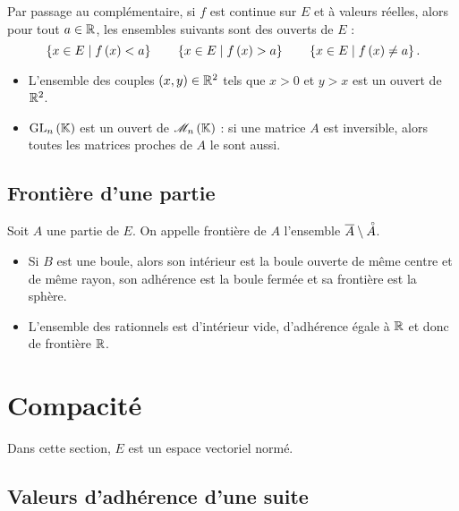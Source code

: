 Par passage au complémentaire, si \(f\) est continue sur \(E\) et à valeurs réelles, alors pour tout \(a\in\mathbb{R}\), les ensembles suivants sont des ouverts de \(E\) : \[\left\lbrace x\in E\;\middle|\; f\left(x\right)<a\right\rbrace\qquad\left\lbrace x\in E\;\middle|\; f\left(x\right)>a\right\rbrace\qquad\left\lbrace x\in E\;\middle|\; f\left(x\right)\not=a\right\rbrace.\]

\begin{ex}
\begin{itemize}
    \item L'ensemble des couples \(\left(x,y\right)\in\mathbb{R}^2\) tels que \(x>0\) et \(y>x\) est un ouvert de \(\mathbb{R}^2\). \\
    \item \(\GL{n}\) est un ouvert de \(\M{n}\) : si une matrice \(A\) est inversible, alors toutes les matrices proches de \(A\) le sont aussi.
\end{itemize}
\end{ex}

\subsection{Frontière d'une partie}

\begin{defi}
Soit \(A\) une partie de \(E\). On appelle frontière de \(A\) l'ensemble \(\overline{A}\setminus\accentset{\circ}{A}\).
\end{defi}

\begin{ex}
\begin{itemize}
    \item Si \(B\) est une boule, alors son intérieur est la boule ouverte de même centre et de même rayon, son adhérence est la boule fermée et sa frontière est la sphère. \\
    \item L'ensemble des rationnels est d'intérieur vide, d'adhérence égale à \(\mathbb{R}\) et donc de frontière \(\mathbb{R}\).
\end{itemize}
\end{ex}

\section{Compacité}

Dans cette section, \(E\) est un espace vectoriel normé.

\subsection{Valeurs d'adhérence d'une suite}

